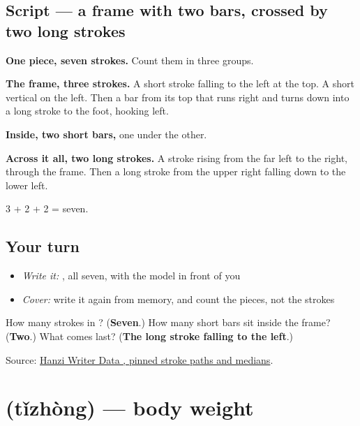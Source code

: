 \subsection*{Script — a frame with two bars, crossed by two long strokes}

\begin{quote}
\end{quote}

\textbf{One piece, seven strokes.} Count them in three groups.

\textbf{The frame, three strokes.} A short stroke falling to the left at the top. A short vertical on the left. Then a bar from its top that runs right and turns down into a long stroke to the foot, hooking left.

\textbf{Inside, two short bars,} one under the other.

\textbf{Across it all, two long strokes.} A stroke rising from the far left to the right, through the frame. Then a long stroke from the upper right falling down to the lower left.

3 + 2 + 2 = seven.

\subsection*{Your turn}
\begin{itemize}
\raggedright
  \item \emph{Write it:} , all seven, with the model in front of you
  \item \emph{Cover:} write it again from memory, and count the pieces, not the strokes
\end{itemize}

\begin{tcolorbox}[breakable,colback=teal!4,colframe=teal!35!black,title={Before you move on}]
How many strokes in ? (\textbf{Seven}.) How many short bars sit inside the frame? (\textbf{Two}.) What comes last? (\textbf{The long stroke falling to the left}.)

Source: \href{https://raw.githubusercontent.com/chanind/hanzi-writer-data/68d10a4b21150cae5e1ebbd223eed289cf32d90c/data/\%E8\%BA\%AB.json}{Hanzi Writer Data , pinned stroke paths and medians}.
\end{tcolorbox}
\section[\texorpdfstring{\zh{体重} (tǐzhòng)}{体重 (tǐzhòng)}]{ (tǐzhòng) — body weight}

